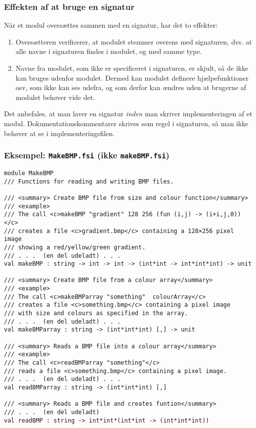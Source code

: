 \documentclass{beamer}
\begin{document}
\begin{frame}%
\frametitle{Effekten af at bruge en signatur}

Når et modul oversættes sammen med en signatur, har det to effekter:

\begin{enumerate}
\item Oversætteren verificerer, at modulet stemmer overens med
  signaturen, dvs. at alle navne i signaturen findes i modulet, og med
  samme type.
\item Navne fra modulet, som ikke er specificeret i signaturen, er
  skjult, så de ikke kan bruges udenfor modulet.  Dermed kan modulet
  definere hjælpefunktioner osv, som ikke kan ses udefra, og som
  derfor kan ændres uden at brugerne af modulet behøver vide det.
\end{enumerate}

Det anbefales, at man laver en signatur \emph{inden} man skriver
implementeringen af et modul.  Dokumentationskommentarer skrives som
regel i signaturen, så man ikke behøver at se i implementeringsfilen.

\end{frame}

\begin{frame}[fragile=singleslide]
\frametitle{Eksempel: \texttt{MakeBMP.fsi} (ikke \texttt{makeBMP.fsi})}

\renewcommand{\baselinestretch}{0.65}
{\scriptsize
\begin{verbatim}
module MakeBMP
/// Functions for reading and writing BMP files.

/// <summary> Create BMP file from size and colour function</summary>
/// <example>
/// The call <c>makeBMP "gradient" 128 256 (fun (i,j) -> (i+i,j,0))</c>
/// creates a file <c>gradient.bmp</c> containing a 128×256 pixel image
/// showing a red/yellow/green gradient.
/// . . .  (en del udeladt) . . .
val makeBMP : string -> int -> int -> (int*int -> int*int*int) -> unit

/// <summary> Create BMP file from a colour array</summary>
/// <example>
/// The call <c>makeBMParray "something"  colourArray</c>
/// creates a file <c>something.bmp</c> containing a pixel image
/// with size and colours as specified in the array.
/// . . .  (en del udeladt) . . .
val makeBMParray : string -> (int*int*int) [,] -> unit

/// <summary> Reads a BMP file into a colour array</summary>
/// <example>
/// The call <c>readBMParray "something"</c>
/// reads a file <c>something.bmp</c> containing a pixel image.
/// . . .  (en del udeladt) . . .
val readBMParray : string -> (int*int*int) [,]

/// <summary> Reads a BMP file and creates funtion</summary>
/// . . .  (en del udeladt)
val readBMP : string -> int*int*(int*int -> (int*int*int))
\end{verbatim}
}
\renewcommand{\baselinestretch}{1.0}

\end{frame}
\end{document}
